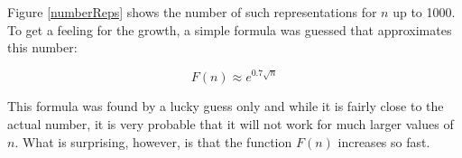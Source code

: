 \documentclass[onecolumn]{article}
\begin{document}
Figure \ref{numberReps} shows the number of such representations for $n$ up to 1000. To get a feeling
for the growth, a simple formula was guessed that approximates this number:

\begin{equation}
    F(n) \approx e^{0.7 \sqrt{n}}
\end{equation}

This formula was found by a lucky guess only and while it is fairly close to the actual number, it is
very probable that it will not work for much larger values of $n$. What is surprising, however, is that
the function $F(n)$ increases so fast.
\end{document}
